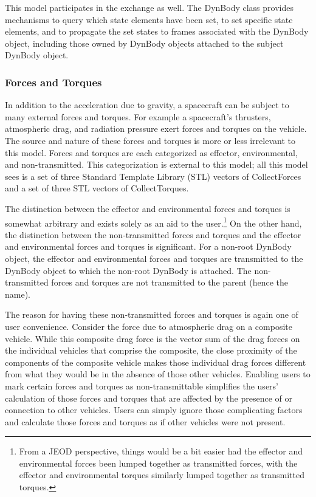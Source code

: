 This model participates in the exchange as well. The DynBody class provides
mechanisms
to query which state elements have been set,
to set specific state elements, and
to propagate the set states to frames associated with the DynBody object,
including those owned by DynBody objects attached to the subject DynBody
object.


\subsubsection{Forces and Torques}
In addition to the acceleration due to gravity,
a spacecraft can be subject to many external forces and torques.
For example a spacecraft's thrusters, atmospheric drag, and radiation pressure
exert forces and torques on the vehicle. The source and nature of these forces
and torques is more or less irrelevant to this model.
Forces and torques are each categorized as effector, environmental, and
non-transmitted. This categorization is external to this model; all this model
sees is a set of three Standard Template Library (STL) vectors of
CollectForces and a set of three STL vectors of CollectTorques.

The distinction between the effector and environmental forces and torques is
somewhat arbitrary and exists solely as an aid to the user.\footnote{From a
JEOD perspective, things would be a bit easier had the effector and
environmental  forces been lumped together as transmitted forces, with the
effector and environmental torques similarly lumped together as transmitted
torques.}
On the other hand, the distinction between the non-transmitted forces and
torques and the effector and environmental forces and torques is significant.
For a non-root DynBody object, the effector and environmental forces and
torques are transmitted to the DynBody object to which the non-root DynBody is
attached. The non-transmitted forces and torques are not transmitted to the
parent (hence the name).

The reason for having these non-transmitted forces and torques is again one of
user convenience. Consider the force due to atmospheric drag on a composite
vehicle. While this composite drag force is the vector sum of the drag forces
on the individual vehicles that comprise the composite, the close proximity of
the components of the composite vehicle makes those individual drag forces
different from what they would be in the absence of those other vehicles.
Enabling users to mark certain forces and torques as non-transmittable
simplifies the users' calculation of those forces and torques that are affected
by the presence of or connection to other vehicles. Users can simply ignore
those complicating factors and calculate those forces and torques as if other
vehicles were not present.

